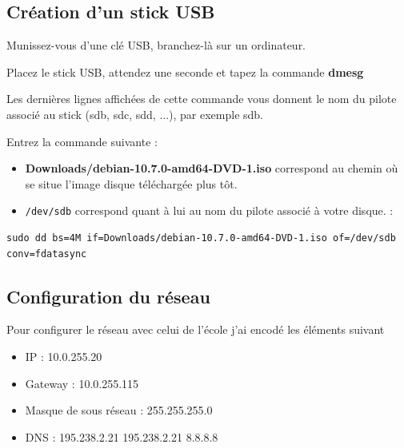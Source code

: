\documentclass[12pt,a4paper]{article}
\newcommand{\code}[1]{\colorbox{light-gray}{\texttt{#1}}}
\begin{document}
\begin{flushleft}
       \subsection{Création d'un stick USB}
       \item Munissez-vous d'une clé USB, branchez-là sur un ordinateur.
       \item Placez le stick USB, attendez une seconde et tapez la commande \textbf{dmesg}
       \item Les dernières lignes affichées de cette commande vous donnent le nom du pilote associé au stick (sdb,
sdc, sdd, ...), par exemple sdb.
        \item Entrez la commande suivante : 
        \begin{itemize}
            \item \textbf{Downloads/debian-10.7.0-amd64-DVD-1.iso} correspond au chemin où se situe l'image disque téléchargée plus tôt. 
            \item \code{/dev/sdb} correspond quant à lui au nom du pilote associé à votre disque. : 
        \end{itemize}
        \begin{lstlisting}
sudo dd bs=4M if=Downloads/debian-10.7.0-amd64-DVD-1.iso of=/dev/sdb conv=fdatasync
        \end{lstlisting}
        

       \subsection{Configuration du réseau}
       \item Pour configurer le réseau avec celui de l'école j'ai encodé les éléments suivant
       \begin{itemize}
           \item IP : 10.0.255.20
           \item Gateway : 10.0.255.115
           \item Masque de sous réseau : 255.255.255.0
           \item DNS : 195.238.2.21 195.238.2.21 8.8.8.8
       \end{itemize}

\end{flushleft}
\end{document}
